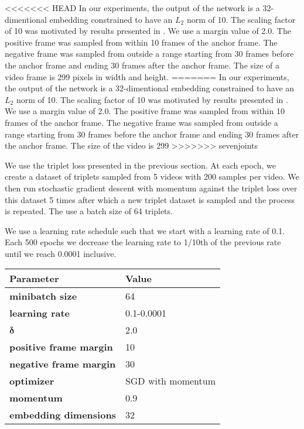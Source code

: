 <<<<<<< HEAD
In our experiments, the output of the network is a 32-dimentional embedding constrained to have an $L_2$ norm of 10. The scaling factor of 10 was motivated by results presented in \cite{constrained-softmax-loss}. We use a margin value of 2.0. The positive frame was sampled from within 10 frames of the anchor frame. The negative frame was sampled from outside a range starting from 30 frames before the anchor frame and ending 30 frames after the anchor frame. The size of a video frame is 299 pixels in width and height.
=======
In our experiments, the output of the network is a 32-dimentional embedding constrained to have an $L_2$ norm of 10. The scaling factor of 10 was motivated by results presented in \cite{constrained-softmax-loss}. We use a margin value of 2.0. The positive frame was sampled from within 10 frames of the anchor frame. The negative frame was sampled from outside a range starting from 30 frames before the anchor frame and ending 30 frames after the anchor frame. The size of the video is 299
>>>>>>> sevenjoints

We use the triplet loss presented in the previous section. At each epoch, we create a dataset of triplets sampled from 5 videos with 200 samples per video. We then run stochastic gradient descent with momentum against the triplet loss over this dataset 5 times after which a new triplet dataset is sampled and the process is repeated. The use a batch size of 64 triplets.

We use a learning rate schedule such that we start with a learning rate of 0.1. Each 500 epochs we decrease the learning rate to 1/10th of the previous rate until we reach 0.0001 inclusive.

{
    \vspace{0.5cm}
    \centering
    \begin{tabular}{@{}ll@{}}
    \toprule
    \textbf{Parameter}             & \textbf{Value}    \\ \midrule
    \textbf{minibatch size}        & 64                \\
    \textbf{learning rate}         & 0.1-0.0001        \\
    $\boldsymbol{\delta}$                & 2.0               \\
    \textbf{positive frame margin} & 10                \\
    \textbf{negative frame margin} & 30                \\
    \textbf{optimizer}             & SGD with momentum \\
    \textbf{momentum}              & 0.9               \\
    \textbf{embedding dimensions}  & 32
    \end{tabular}
    \label{cnn-params}
}

